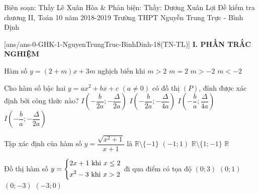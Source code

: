 \begin{name}
{Biên soạn: Thầy Lê Xuân Hòa \& Phản biện: Thầy:  Dương Xuân Lợi}
		{Đề kiểm tra chương II, Toán 10 năm 2018-2019 Trường THPT Nguyễn Trung Trực - Bình Định}
	\end{name}
	\setcounter{ex}{0}\setcounter{bt}{0}
	[ans/ans-0-GHK-1-NguyenTrungTruc-BinhDinh-18(TN-TL)]
\noindent\textbf{I. PHẦN TRẮC NGHIỆM}
\begin{ex}%
Hàm số $y=(2+m)x +3m$ nghịch biến khi
	\choice
	{$m>2$}
	{$m=2$}
	{$m>-2$}
	{\True $m<-2$}
\end{ex}

\begin{ex}%
Cho hàm số bậc hai $y =ax^2 +bx +c $ $(a\ne 0)$ có đồ thị $(P)$, đỉnh được xác định bởi công thức nào?
	\choice
	{$I\left(-\dfrac{b}{2a}; -\dfrac{\Delta}{2a}\right)$}
	{\True $I\left( -\dfrac{b}{2a}; -\dfrac{\Delta}{4a}\right)$}
	{$I\left( -\dfrac{b}{a}; \dfrac{\Delta}{4a}\right)$}
	{$I\left( -\dfrac{b}{a}; -\dfrac{\Delta}{2a}\right)$}
\end{ex}

\begin{ex}%
Tập xác định của hàm số $y=\dfrac{\sqrt{x^2+1}}{x+1}$ là
	\choice
	{\True $\mathbb{R}\setminus \{-1\}$}
	{$(-1;1)$}
	{$\mathbb{R}\setminus \{1; -1\}$}
	{$\mathbb{R}$}
\end{ex}

\begin{ex}%
Đồ thị hàm số $y=\left\{\begin{aligned}&2x+1\,\, \text{khi } x\le 2 \\& x^2 -3\,\, \text{khi } x>2\end{aligned}\right.$ đi qua điểm có tọa độ
	\choice
	{$(0;3)$}
	{\True $(0;1)$}
	{$(0;-3)$}
	{$(-3;0)$}
\end{ex}

